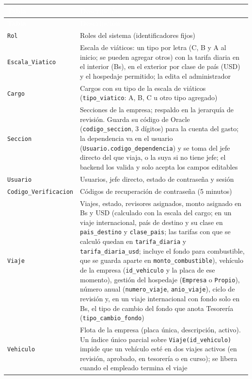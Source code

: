 \documentclass[11pt,letterpaper]{article}
\newcommand{\cabecera}{\rowcolor{maxamPrimario}}
\newcommand{\tth}[1]{\textcolor{white}{\textbf{#1}}}
\newcommand{\code}[1]{\nolinkurl{#1}}
\begin{document}
\begin{xltabular}{\textwidth}{L{4.8cm} Y}
\cabecera \tth{Tabla} & \tth{Descripción} \\
\endfirsthead
\cabecera \tth{Tabla} & \tth{Descripción} \\
\endhead
{} \code{Rol} & Roles del sistema (identificadores fijos) \\
\code{Escala_Viatico} & Escala de viáticos: un tipo por letra (C, B y A al inicio; se pueden agregar otros) con la tarifa diaria en el interior (Bs), en el exterior por clase de país (USD) y el hospedaje permitido; la edita el administrador \\
 \code{Cargo} & Cargos con su tipo de la escala de viáticos (\code{tipo_viatico}: A, B, C u otro tipo agregado) \\
 \code{Seccion} & Secciones de la empresa; respaldo en la jerarquía de revisión. Guarda su código de Oracle (\code{codigo_seccion}, 3 dígitos) para la cuenta del gasto; la dependencia va en el usuario (\code{Usuario.codigo_dependencia}) y se toma del jefe directo del que viaja, o la suya si no tiene jefe; el backend los valida y solo acepta los campos editables \\
\code{Usuario} & Usuarios, jefe directo, estado de contraseña y sesión \\
 \code{Codigo_Verificacion} & Códigos de recuperación de contraseña (5 minutos) \\
\code{Viaje} & Viajes, estado, revisores asignados, monto asignado en Bs y USD (calculado con la escala del cargo; en un viaje internacional, país de destino y su clase en \code{pais_destino} y \code{clase_pais}; las tarifas con que se calculó quedan en \code{tarifa_diaria} y \code{tarifa_diaria_usd}; incluye el fondo para combustible, que se guarda aparte en \code{monto_combustible}), vehículo de la empresa (\code{id_vehiculo} y la placa de ese momento), gestión del hospedaje (\code{Empresa} o \code{Propio}), número anual (\code{numero_viaje}, \code{anio_viaje}), ciclo de revisión y, en un viaje internacional con fondo solo en Bs, el tipo de cambio del fondo que anota Tesorería (\code{tipo_cambio_fondo}) \\
 \code{Vehiculo} & Flota de la empresa (placa única, descripción, activo). Un índice único parcial sobre \code{Viaje(id_vehiculo)} impide que un vehículo esté en dos viajes activos (en revisión, aprobado, en tesorería o en curso); se libera cuando el empleado termina el viaje \\

\end{xltabular}
\end{document}
